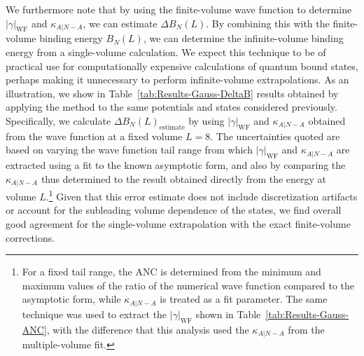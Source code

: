 \documentclass[aps,singlecolumn,superscriptaddress,nofootinbib,tightenlines,
preprintnumbers,showkeys]{revtex4-1}
\newcommand{\abs}[1]{\left|#1\right|}
\begin{document}
We furthermore note that by using the finite-volume wave function to determine 
$\abs{\gamma}_{\text{WF}}$ and $\kappa_{A|N{-}A}$, we can estimate $\Delta 
B_N(L)$.  By combining this with the finite-volume binding energy $B_N(L)$, we 
can determine the infinite-volume binding energy from a single-volume 
calculation.  We expect this technique to be of practical use for 
computationally expensive calculations of quantum bound states, perhaps making 
it unnecessary to perform infinite-volume extrapolations.  As an illustration, 
we show in Table~\ref{tab:Results-Gauss-DeltaB} results obtained by applying 
the method to the same potentials and states considered previously.  
Specifically, we calculate $\Delta B_N(L)_{\text{estimate}}$ by using 
$\abs{\gamma}_{\text{WF}}$ and $\kappa_{A|N{-}A}$ obtained from the wave 
function at a fixed volume $L=8$.  The uncertainties quoted are based on
varying the wave function tail range from which $\abs{\gamma}_{\text{WF}}$ and 
$\kappa_{A|N{-}A}$ are extracted using a fit to the known asymptotic form, and 
also by comparing the $\kappa_{A|N{-}A}$ thus determined to the result obtained 
directly from the energy at volume $L$.\footnote{For a fixed tail range, the 
ANC is determined from the minimum and maximum values of the ratio of the 
numerical wave function compared to the asymptotic form, while 
$\kappa_{A|N{-}A}$ is treated as a fit parameter.  The same technique 
was used to extract the $\abs{\gamma}_{\text{WF}}$ shown in 
Table~\ref{tab:Results-Gauss-ANC}, with the difference that this analysis used  
the $\kappa_{A|N{-}A}$ from the multiple-volume fit.}  Given that this error 
estimate does not include discretization artifacts or account for the subleading 
volume dependence of the states, we find overall good agreement for the 
single-volume extrapolation with the exact finite-volume corrections.
%
\end{document}
